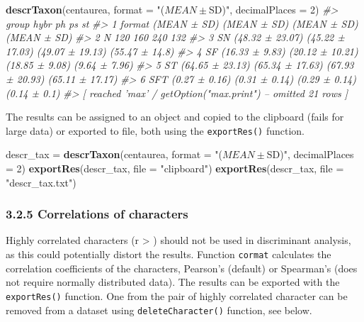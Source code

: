 \documentclass[
]{article}
\newenvironment{Shaded}{\begin{snugshade}}{\end{snugshade}}
\newcommand{\CommentTok}[1]{\textcolor[rgb]{0.56,0.35,0.01}{\textit{#1}}}
\newcommand{\DataTypeTok}[1]{\textcolor[rgb]{0.13,0.29,0.53}{#1}}
\newcommand{\DecValTok}[1]{\textcolor[rgb]{0.00,0.00,0.81}{#1}}
\newcommand{\KeywordTok}[1]{\textcolor[rgb]{0.13,0.29,0.53}{\textbf{#1}}}
\newcommand{\NormalTok}[1]{#1}
\newcommand{\StringTok}[1]{\textcolor[rgb]{0.31,0.60,0.02}{#1}}
\begin{document}
\begin{Shaded}
\begin{Highlighting}[]
\KeywordTok{descrTaxon}\NormalTok{(centaurea, }\DataTypeTok{format =} \StringTok{"($MEAN ± $SD)"}\NormalTok{, }\DataTypeTok{decimalPlaces =} \DecValTok{2}\NormalTok{)}
\CommentTok{#>    group            hybr              ph              ps              st}
\CommentTok{#> 1 format     (MEAN ± SD)     (MEAN ± SD)     (MEAN ± SD)     (MEAN ± SD)}
\CommentTok{#> 2      N             120             160             240             132}
\CommentTok{#> 3     SN (48.32 ± 23.07) (45.22 ± 17.03) (49.07 ± 19.13)  (55.47 ± 14.8)}
\CommentTok{#> 4     SF  (16.33 ± 9.83) (20.12 ± 10.21)  (18.85 ± 9.08)   (9.64 ± 7.96)}
\CommentTok{#> 5     ST (64.65 ± 23.13) (65.34 ± 17.63) (67.93 ± 20.93) (65.11 ± 17.17)}
\CommentTok{#> 6    SFT   (0.27 ± 0.16)   (0.31 ± 0.14)   (0.29 ± 0.14)    (0.14 ± 0.1)}
\CommentTok{#>  [ reached 'max' / getOption("max.print") -- omitted 21 rows ]}
\end{Highlighting}
\end{Shaded}

The results can be assigned to an object and copied to the clipboard
(fails for large data) or exported to file, both using the
\texttt{exportRes()} function.

\begin{Shaded}
\begin{Highlighting}[]
\NormalTok{descr_tax =}\StringTok{ }\KeywordTok{descrTaxon}\NormalTok{(centaurea, }\DataTypeTok{format =} \StringTok{"($MEAN ± $SD)"}\NormalTok{, }\DataTypeTok{decimalPlaces =} \DecValTok{2}\NormalTok{)}
\KeywordTok{exportRes}\NormalTok{(descr_tax, }\DataTypeTok{file =} \StringTok{"clipboard"}\NormalTok{)}
\KeywordTok{exportRes}\NormalTok{(descr_tax, }\DataTypeTok{file =} \StringTok{"descr_tax.txt"}\NormalTok{)}
\end{Highlighting}
\end{Shaded}

\hypertarget{correlations-of-characters}{%
\subsubsection{3.2.5 Correlations of
characters}\label{correlations-of-characters}}

Highly correlated characters (r \textgreater{} \textbar)
should not be used in discriminant analysis, as this could potentially
distort the results. Function \texttt{cormat} calculates the correlation
coefficients of the characters, Pearson's (default) or Spearman's (does
not require normally distributed data). The results can be exported with
the \texttt{exportRes()} function. One from the pair of highly
correlated character can be removed from a dataset using
\texttt{deleteCharacter()} function, see below.
\end{document}
